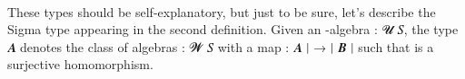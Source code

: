 \begin{code}
\AgdaSpace{}%
\AgdaSpace{}%
\AgdaSpace{}%
\AgdaSpace{}%
\AgdaSpace{}%
\<%
\\
%
\>[1]\AgdaSpace{}%
\AgdaSpace{}%
\AgdaSymbol{=}\AgdaSpace{}%
\AgdaSpace{}%
\AgdaSpace{}%
\AgdaSpace{}%
\AgdaSymbol{(}\AgdaSpace{}%
\AgdaSpace{}%
\AgdaSymbol{)}\AgdaSpace{}%
\AgdaFunction{,}\AgdaSpace{}%
\AgdaSpace{}%
\AgdaSpace{}%
\AgdaSpace{}%
\AgdaSymbol{(}\AgdaSpace{}%
\AgdaSpace{}%
\AgdaSpace{}%
\AgdaSpace{}%
\AgdaSpace{}%
\AgdaSpace{}%
\AgdaSymbol{)}\AgdaSpace{}%
\AgdaFunction{,}\AgdaSpace{}%
\AgdaSpace{}%
\AgdaSpace{}%
\AgdaSpace{}%
\AgdaSpace{}%
\AgdaSpace{}%
\AgdaSpace{}%
\<%
\end{code}
\ccpad
These types should be self-explanatory, but just to be sure, let's describe the Sigma type appearing in the second definition. Given an -algebra  \as :  \ab 𝓤 \ab 𝑆, the type
 \ab 𝑨 denotes the class of algebras  \as :  \ab 𝓦 \ab 𝑆 with a map  \as :  \ab 𝑨 \af ∣ \as → \af ∣ \ab 𝑩 \af ∣ such that  is a surjective homomorphism.

